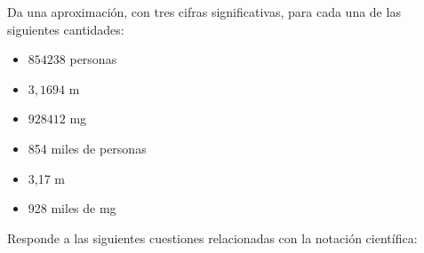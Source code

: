 \documentclass[addpoints,spanish, 12pt,a4paper]{exam}
\begin{document}
\begin{questions}
\question[1] Da una aproximación, con tres cifras significativas, para cada una de las
siguientes cantidades:
\begin{itemize}
\item $854 238$ personas
\item $3,1694$ m
\item $928 412$ mg
\end{itemize}
\begin{solution} 
\begin{itemize}
\item 854 miles de personas
\item 3,17 m
\item 928 miles de mg
\end{itemize}
\end{solution}

\addpoints



\question Responde a las siguientes cuestiones relacionadas con la notación científica:
\end{questions}
\end{document}
